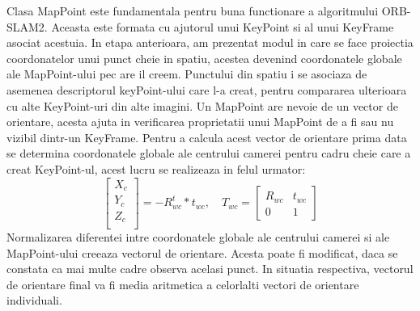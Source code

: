 \documentclass[12pt,a4paper]{report}
\begin{document}
Clasa MapPoint este fundamentala pentru buna functionare a algoritmului ORB-SLAM2. Aceasta este 
formata cu ajutorul unui KeyPoint si al unui KeyFrame asociat acestuia. In etapa anterioara, 
am prezentat modul in care se face proiectia coordonatelor unui punct cheie in spatiu, acestea 
devenind coordonatele globale ale MapPoint-ului pec are il creem. Punctului din spatiu 
i se asociaza de asemenea descriptorul keyPoint-ului care l-a creat, pentru compararea ulterioara 
cu alte KeyPoint-uri din alte imagini. Un MapPoint are nevoie de un vector de orientare, acesta 
ajuta in verificarea proprietatii unui MapPoint de a fi sau nu vizibil dintr-un KeyFrame. Pentru a 
calcula acest vector de orientare prima data se determina coordonatele globale ale centrului camerei
pentru cadru cheie care a creat KeyPoint-ul, acest lucru se realizeaza in felul urmator:
\begin{equation}
    \begin{bmatrix}
        X_{c} \\
        Y_{c} \\
        Z_{c} \\
        \end{bmatrix} = -R_{wc}^t * t_{wc}, \quad{}  
        T_{wc} =     
     \begin{bmatrix}
            R_{wc} & t_{wc} \\
            0 & 1
        \end{bmatrix}
\end{equation} 
Normalizarea diferentei intre coordonatele globale ale centrului camerei si ale MapPoint-ului creeaza
vectorul de orientare. Acesta poate fi modificat, daca se constata ca mai multe cadre observa acelasi
punct. In situatia respectiva, vectorul de orientare final va fi media aritmetica a celorlalti vectori 
de orientare individuali.
\end{document}
